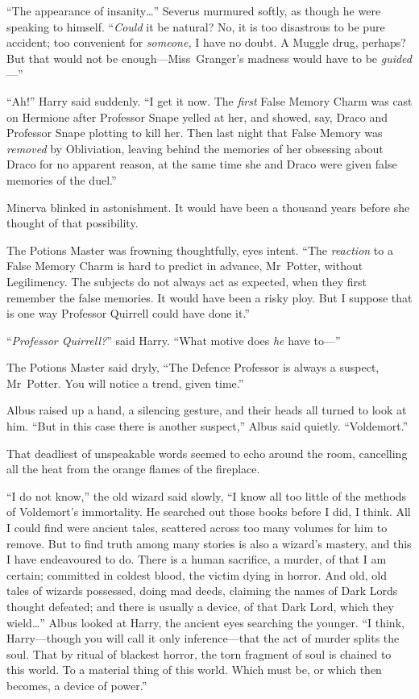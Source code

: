 “The appearance of insanity…” Severus murmured softly, as though he were speaking to himself. “\emph{Could} it be natural? No, it is too disastrous to be pure accident; too convenient for \emph{someone,} I have no doubt. A Muggle drug, perhaps? But that would not be enough—Miss~Granger’s madness would have to be \emph{guided}—”

“Ah!” Harry said suddenly. “I get it now. The \emph{first} False Memory Charm was cast on Hermione after Professor Snape yelled at her, and showed, say, Draco and Professor Snape plotting to kill her. Then last night that False Memory was \emph{removed} by Obliviation, leaving behind the memories of her obsessing about Draco for no apparent reason, at the same time she and Draco were given false memories of the duel.”

Minerva blinked in astonishment. It would have been a thousand years before she thought of that possibility.

The Potions Master was frowning thoughtfully, eyes intent. “The \emph{reaction} to a False Memory Charm is hard to predict in advance, Mr~Potter, without Legilimency. The subjects do not always act as expected, when they first remember the false memories. It would have been a risky ploy. But I suppose that is one way Professor Quirrell could have done it.”

“\emph{Professor Quirrell?}” said Harry. “What motive does \emph{he} have to—”

The Potions Master said dryly, “The Defence Professor is always a suspect, Mr~Potter. You will notice a trend, given time.”

Albus raised up a hand, a silencing gesture, and their heads all turned to look at him. “But in this case there is another suspect,” Albus said quietly. “Voldemort.”

That deadliest of unspeakable words seemed to echo around the room, cancelling all the heat from the orange flames of the fireplace.

“I do not know,” the old wizard said slowly, “I know all too little of the methods of Voldemort’s immortality. He searched out those books before I did, I think. All I could find were ancient tales, scattered across too many volumes for him to remove. But to find truth among many stories is also a wizard’s mastery, and this I have endeavoured to do. There is a human sacrifice, a murder, of that I am certain; committed in coldest blood, the victim dying in horror. And old, old tales of wizards possessed, doing mad deeds, claiming the names of Dark Lords thought defeated; and there is usually a device, of that Dark Lord, which they wield…” Albus looked at Harry, the ancient eyes searching the younger. “I think, Harry—though you will call it only inference—that the act of murder splits the soul. That by ritual of blackest horror, the torn fragment of soul is chained to this world. To a material thing of this world. Which must be, or which then becomes, a device of power.”

